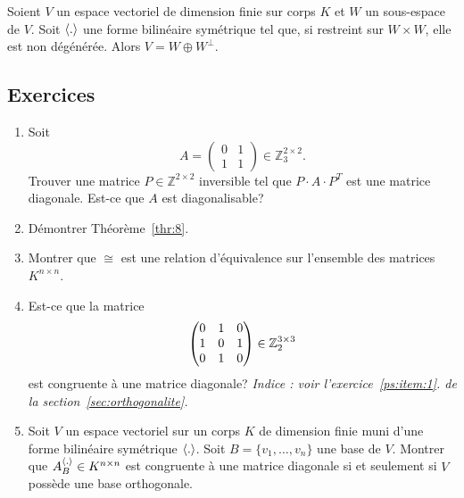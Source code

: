\begin{theorem}
  \label{thr:8}
  Soient $V$ un espace vectoriel de dimension finie sur corps $K$ et $W$ un sous-espace de $V$. Soit $\langle {.} \rangle$ une forme bilinéaire symétrique tel que, si restreint sur $W\times W$, elle est non dégénérée. Alors $V = W \oplus W^\perp$.  
\end{theorem}

\subsection*{Exercices}

\begin{enumerate}
\item Soit
  \begin{displaymath}
    A =
    \begin{pmatrix}
      0 & 1 \\
      1 & 1 
    \end{pmatrix}
    ∈ ℤ_3^{2 ×2}. 
  \end{displaymath}
  Trouver une matrice $P ∈ ℤ^{2 ×2}$ inversible tel que  $P ⋅A⋅ P^T$ est une matrice diagonale. Est-ce que $A$ est diagonalisable? 
\item Démontrer Théorème~\ref{thr:8}. 
\item Montrer que $\cong$ est une relation d'équivalence sur l'ensemble des matrices $K^{n\times n}$. 
\item Est-ce que la matrice 
  \begin{displaymath}
    \begin{pmatrix}
      0 & 1 & 0 \\
      1 & 0 & 1\\
      0 & 1 & 0 
    \end{pmatrix} \in \mathbb{Z}_2^{3\times 3} 
  \end{displaymath}
  est congruente à une matrice diagonale? \emph{Indice : voir l'exercice~\ref{ps:item:1}. de la section~\ref{sec:orthogonalite}.}  
\item Soit $V$ un espace vectoriel  sur un corps $K$ de dimension finie muni d'une forme bilinéaire symétrique $\langle {.} \rangle$. Soit $B = \{v_1,\dots,v_n\}$ une base de $V$. Montrer que $A_B^{\langle {.} \rangle} \in K^{n \times n}$ est congruente à une matrice diagonale si  et seulement si $V$ possède une base orthogonale. 


\end{enumerate}

